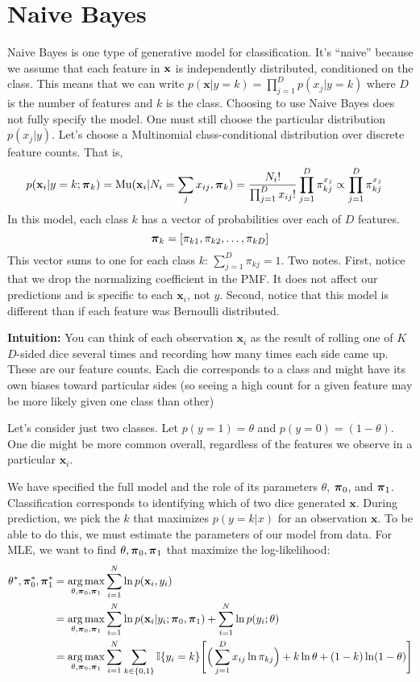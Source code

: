 \documentclass[11pt,letterpaper]{article}
\begin{document}
\section{Naive Bayes}

Naive Bayes is one type of generative model for classification.
It's ``naive'' because we assume that each feature in
$\mathbf{x}$ is independently distributed, conditioned on the class. This means
that we can write $p(\mathbf{x}|y=k) =  \prod_{j=1}^D p(x_j|y=k)$ where
$D$ is the number of features and $k$ is the class. Choosing to use
Naive Bayes does not fully specify the model. One must still choose
the particular distribution $p(x_j|y)$. Let's choose a Multinomial 
class-conditional distribution over discrete feature counts. That is,
\begin{align*}
    p(\mathbf{x}_i | y=k; \boldsymbol{\pi}_k) &= \text{Mu}(\mathbf{x}_i | N_{i} = \sum_{j} x_{ij}, \boldsymbol{\pi}_k)
    = \frac{N_i!}{\prod_{j=1}^D x_{ij}!} \prod_{j=1}^D \pi_{kj}^{x_{j}}
    \propto \prod_{j=1}^D \pi_{kj}^{x_{j}}
\end{align*}
\noindent In this model, each class $k$ has a vector of probabilities over each of $D$ features.
$$\boldsymbol{\pi}_{k} = [\pi_{k1}, \pi_{k2},\ldots,\pi_{kD}]$$
This vector sums to one for each class $k$: $\sum_{j=1}^D \pi_{kj} = 1$.
Two notes. First, notice that we drop the normalizing coefficient in the PMF.
It does not affect our predictions and is specific to each $\mathbf{x}_i$, not $y$.
Second, notice that this model is different than if each feature was Bernoulli
distributed.

\textbf{Intuition:} You can think of each observation $\mathbf{x}_i$ as the result of 
rolling one of $K$ $D$-sided dice several times and recording how many times each side came up.
These are our feature counts. Each die corresponds to a class and might have its own biases 
toward particular sides (so seeing a high count for a given feature may be more likely 
given one class than other) 

Let's consider just two classes. Let $p(y=1) = \theta$ and $p(y=0) = (1 - \theta)$.
One die might be more common overall, regardless of the features we observe in a particular
$\mathbf{x}_i$. 

We have specified the full model and the role of its 
parameters $\theta$, $\boldsymbol{\pi}_0$, and $\boldsymbol{\pi}_1$. 
Classification corresponds to identifying which of two dice generated $\mathbf{x}$.
During prediction, we pick the $k$ that maximizes $p(y=k|x)$ for an observation $\mathbf{x}$.
To be able to do this, we must estimate the parameters of our model from data.
For MLE, we want to find $\theta, \boldsymbol{\pi}_0, \boldsymbol{\pi}_1$ that maximize the log-likelihood:
%
\begin{align*}
 \theta^*,\bpi_0^*,\bpi_1^* &=
    \argmax_{\theta, \bpi_0, \bpi_1} \sum_{i=1}^N \ln p(\boldx_i , y_i)\\
    &=\argmax_{\theta,\bpi_0, \bpi_1}\sum_{i=1}^N 
        \ln p(\boldx_i | y_i; \bpi_0, \bpi_1) + 
        \sum_{i=1}^N  \ln p(y_i;\theta)\\
    &=\argmax_{\theta, \bpi_0, \bpi_1} \sum_{i=1}^N \sum_{k \in \{0,1\}} 
    \mathbb{I}\{y_i=k\}
    \Bigg[\Big(\sum_{j=1}^D x_{ij} \ln \pi_{kj} \Big) + 
    k \ln \theta + (1 - k) \ln(1 - \theta) \Bigg]
\end{align*}
\end{document}
